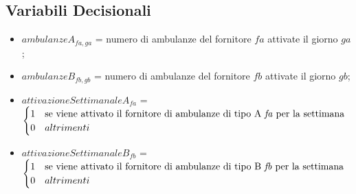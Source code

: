 \subsection{Variabili Decisionali}
\begin{itemize}
    \item $ambulanzeA_{fa, ga}$ = numero di ambulanze del fornitore $fa$ attivate il giorno $ga$;
    \item $ambulanzeB_{fb, gb}$ =  numero di ambulanze del fornitore $fb$ attivate il giorno $gb$;
    \item $attivazioneSettimanaleA_{fa}$ = 
    \(
    \begin{cases}
        1 & \text{se viene attivato il fornitore di ambulanze di tipo A \textit{fa} per la settimana} \\
        0 & altrimenti
    \end{cases}\)
    \item $attivazioneSettimanaleB_{fb}$ = 
    \(
    \begin{cases}
        1 & \text{se viene attivato il fornitore di ambulanze di tipo B \textit{fb} per la settimana} \\
        0 & altrimenti
    \end{cases}\)
\end{itemize}

